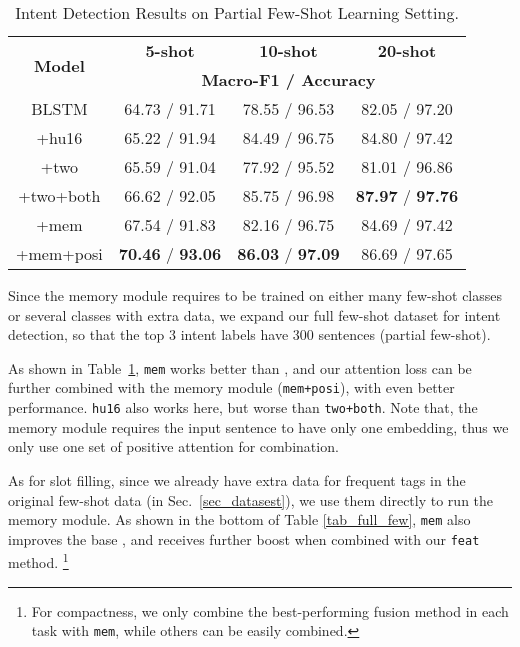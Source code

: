 \begin{table}
\setlength{\tabcolsep}{0.23em}
\centering
\small{
\begin{tabular}{|c|c|c|c|}

\hline
\multirow{2}{*}{\textbf{Model}}  & \multicolumn{1}{|c|}{\textbf{5-shot}} & \multicolumn{1}{|c|}{\textbf{10-shot}} & \multicolumn{1}{|c|}{\textbf{20-shot}}  \\
\cline{2-4}
 & \multicolumn{3}{|c|}{\textbf{Macro-F1 / Accuracy}}   \\
\hline
\rowcolor{Gray} BLSTM & 64.73 / 91.71 & 78.55 / 96.53 & 82.05 / 97.20 \\
\hline
+hu16 & 65.22 / 91.94 & 84.49 / 96.75 & 84.80 / 97.42 \\
\hline
\rowcolor{Gray} +two & 65.59 / 91.04 & 77.92 / 95.52 & 81.01 / 96.86 \\
\hline
+two+both & 66.62 / 92.05 & 85.75 / 96.98 & \textbf{87.97} / \textbf{97.76} \\
\hline
\rowcolor{Gray} +mem & 67.54 / 91.83 & 82.16 / 96.75 & 84.69 / 97.42 \\
\hline
+mem+posi & \textbf{70.46} / \textbf{93.06} & \textbf{86.03} / \textbf{97.09} & 86.69 / 97.65 \\
\hline

\end{tabular}
}
\caption{Intent Detection Results on Partial Few-Shot Learning Setting.}
\label{tab_intent_few_fill}
\end{table}

Since the memory module requires to be trained on either many few-shot classes or several classes with extra data,
we expand our full few-shot dataset for intent detection, so that the top 3 intent labels have 300 sentences (partial few-shot).

As shown in Table~\ref{tab_intent_few_fill}, \texttt{mem} works better than \BLSTM, and our attention loss can be further combined with the memory module (\texttt{mem+posi}), with even better performance. %
\texttt{hu16} also works here, but  worse than \texttt{two+both}.
Note that, the memory module requires the input sentence to have only one embedding, thus we only use one set of positive attention for combination.

As for slot filling, since we already have extra data for frequent tags in the original few-shot data (in Sec.~\ref{sec_datasest}), we use them directly to run the memory module. As shown in the bottom of Table \ref{tab_full_few}, \texttt{mem} also improves the base \BLSTM, and receives further boost when combined with our \texttt{feat} method.%
\footnote{For compactness, we only combine the best-performing fusion method in each task with \texttt{mem}, while others can be easily combined.}

